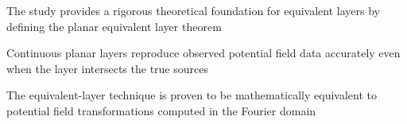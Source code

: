 \documentclass[draft]{agujournal2019}
\begin{document}






\begin{keypoints}
\item The study provides a rigorous theoretical foundation for equivalent layers by defining the planar equivalent layer theorem
\item Continuous planar layers reproduce observed potential field data accurately even when the layer intersects the true sources
\item The equivalent-layer technique is proven to be mathematically equivalent to potential field transformations computed in the Fourier domain
\end{keypoints}

%
%

%
%
\end{document}
